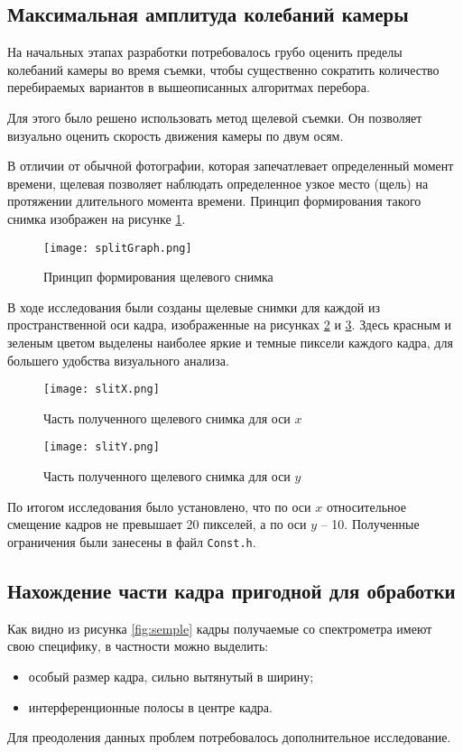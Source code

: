 \subsection{Максимальная амплитуда колебаний камеры}
На начальных этапах разработки потребовалось грубо оценить пределы колебаний камеры во время съемки, чтобы существенно сократить количество перебираемых вариантов в вышеописанных алгоритмах перебора.

Для этого было решено использовать метод щелевой съемки. Он позволяет визуально оценить скорость движения камеры по двум осям.

В отличии от обычной фотографии, которая запечатлевает определенный момент времени, щелевая позволяет наблюдать определенное узкое место (щель) на протяжении длительного момента времени. Принцип  формирования такого снимка изображен на рисунке \ref{fig:splitGraph}.
\begin{figure}[h]
    \centering   
    \texttt{[image: splitGraph.png]} 
    \caption{Принцип  формирования щелевого снимка}
    \label{fig:splitGraph}
\end{figure} 

В ходе исследования были созданы щелевые снимки для каждой из пространственной оси кадра, изображенные на рисунках \ref{fig:slitX} и \ref{fig:slitY}. Здесь красным и зеленым цветом выделены наиболее яркие и темные пиксели каждого кадра, для большего удобства визуального анализа.
\begin{figure}
    \centering   
    \texttt{[image: slitX.png]} 
    \caption{Часть полученного щелевого снимка для оси $x$}
    \label{fig:slitX}
\end{figure} 
\begin{figure}
    \centering   
    \texttt{[image: slitY.png]} 
    \caption{Часть полученного щелевого снимка для оси $y$}
    \label{fig:slitY}
\end{figure} 

По итогом исследования было установлено, что по оси $x$ относительное смещение кадров не превышает 20 пикселей, а по оси $y$ -- 10. Полученные ограничения были занесены в файл \texttt{Const.h}. 
\subsection{Нахождение части кадра пригодной для обработки}
Как видно из рисунка \ref{fig:semple} кадры получаемые со спектрометра имеют свою специфику, в частности можно выделить:
\begin{itemize}
	\item особый размер кадра, сильно вытянутый в ширину;
	\item интерференционные полосы в центре кадра. 
\end{itemize}
Для преодоления данных проблем потребовалось дополнительное исследование.

